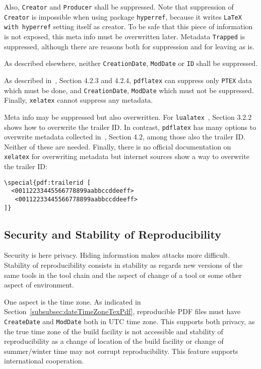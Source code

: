 \documentclass[a4paper, english]{article}%
\newcommand{\pdflatex}{\texttt{pdflatex}}
\newcommand{\lualatex}{\texttt{lualatex}}
\newcommand{\xelatex}{\texttt{xelatex}}
\begin{document}
Also, \texttt{Creator} and \texttt{Producer} shall be suppressed. 
Note that suppression of \texttt{Creator} is impossible when using package \texttt{hyperref}, 
because it writes \texttt{LaTeX with hyperref} setting itself as creator. 
To be safe that this piece of information is not exposed, 
this meta info must be overwritten later. 
Metadata \texttt{Trapped} is suppressed, although there are reasons 
both for suppression and for leaving as is. 

As described elsewhere, neither \texttt{CreationDate}, \texttt{ModDate} or \texttt{ID} shall be suppressed. 

As described in~\cite{PdfTexUsr24}, Section 4.2.3 and 4.2.4, \pdflatex{} can suppress only \texttt{PTEX} data 
which must be done, and \texttt{CreationDate}, \texttt{ModDate} which must not be suppressed. 
Finally, \xelatex{} cannot suppress any metadata. 
\medskip 


Meta info may be suppressed but also overwritten. 
For \lualatex{}~\cite{LuaTexRef24}, Section 3.2.2 shows how to overwrite the trailer ID\@. 
In contrast, \pdflatex{} has many options to overwrite metadata 
collected in~\cite{PdfTexUsr24}, Section 4.2, among those also the trailer ID\@. 
Neither of these are needed. 
Finally, there is no official documentation on \xelatex{} for overwriting metadata 
but internet sources show a way to overwrite the trailer ID\@: 
%
\begin{verbatim}
\special{pdf:trailerid [
  <00112233445566778899aabbccddeeff>
   <00112233445566778899aabbccddeeff>
]}
\end{verbatim}



\subsection{Security and Stability of Reproducibility}\label{subsec:securityRep}






Security is here privacy. 
Hiding information makes attacks more difficult. 
Stability of reproducibility consists in stability as regards new versions of the same tools 
in the tool chain and the aspect of change of a tool or some other aspect of environment. 

One aspect is the time zone. 
As indicated in Section~\ref{subsubsec:dateTimeZoneTexPdf}, 
reproducible PDF files must have \texttt{CreateDate} and \texttt{ModDate} 
both in UTC time zone. 
This supports both privacy, as the true time zone of the build facility is not accessible 
and stability of reproducibility as a change of location of the build facility 
or change of summer/winter time 
may not corrupt reproducibility. 
This feature supports international cooperation. 
\end{document}
